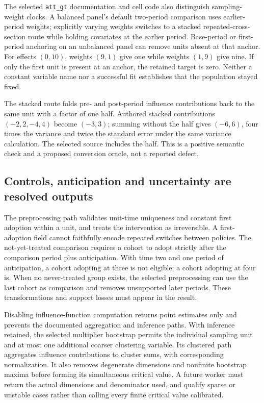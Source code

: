The selected \texttt{att\_gt} documentation and cell code also distinguish
sampling-weight clocks. A balanced panel's default two-period comparison
uses earlier-period weights; explicitly varying weights switches to a stacked
repeated-cross-section route while holding covariates at the earlier period.
Base-period or first-period anchoring on an unbalanced panel can remove units
absent at that anchor. For effects $(0,10)$, weights $(9,1)$ give one while
weights $(1,9)$ give nine. If only the first unit is present at an anchor,
the retained target is zero. Neither a constant variable name nor a successful
fit establishes that the population stayed fixed.
\citep{exec24_panelr_did,exec24_panelr_contract}

The stacked route folds pre- and post-period influence contributions back to
the same unit with a factor of one half. Authored stacked contributions
$(-2,2,-4,4)$ become $(-3,3)$; summing without the half gives $(-6,6)$,
four times the variance and twice the standard error under the same variance
calculation. The selected source includes the half. This is a positive
semantic check and a proposed conversion oracle, not a reported defect.
\citep{exec24_panelr_did,exec24_panelr_contract}

\subsection{Controls, anticipation and uncertainty are resolved outputs}
The preprocessing path validates unit-time uniqueness and constant first
adoption within a unit, and treats the intervention as irreversible. A
first-adoption field cannot faithfully encode repeated switches between
policies. The not-yet-treated comparison requires a cohort to adopt strictly
after the comparison period plus anticipation. With time two and one period
of anticipation, a cohort adopting at three is not eligible; a cohort adopting
at four is. When no never-treated group exists, the selected preprocessing
can use the last cohort as comparison and removes unsupported later periods.
These transformations and support losses must appear in the result.
\citep{exec24_panelr_did,exec24_panelr_contract}

Disabling influence-function computation returns point estimates only and
prevents the documented aggregation and inference paths. With inference
retained, the selected multiplier bootstrap permits the individual sampling
unit and at most one additional coarser clustering variable. Its clustered
path aggregates influence contributions to cluster sums, with corresponding
normalization. It also removes degenerate dimensions and nonfinite bootstrap
maxima before forming its simultaneous critical value. A future worker must
return the actual dimensions and denominator used, and qualify sparse or
unstable cases rather than calling every finite critical value calibrated.
\citep{exec24_panelr_did}

